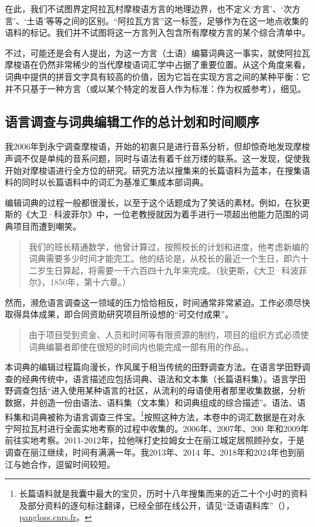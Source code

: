 在此，我们不试图界定阿拉瓦村摩梭语方言的地理边界，也不定义‘方言’、‘次方言’、‘土语’等等之间的区别。“阿拉瓦方言”这一标签，足够作为在这一地点收集的语料的标记。我们并不试图将这一方言列入包含所有摩梭方言的某个综合清单中。

不过，可能还是会有人提出，为这一方言（土语）编纂词典这一事实，就使阿拉瓦摩梭语在仍然非常稀少的当代摩梭语词汇学中占据了重要位置。从这个角度来看，词典中提供的拼音文字具有较高的价值，因为它旨在实现方言之间的某种平衡：它并不只基于一种方言（或以某个特定的发音人作为标准：作为权威参考），细见\textcite{dobbs_ortho_2018}。

\subsection{语言调查与词典编辑工作的总计划和时间顺序}

我2006年到永宁调查摩梭语，开始的初衷只是进行音系分析，但却惊奇地发现摩梭声调不仅是单纯的音系问题，同时与语法有着千丝万缕的联系。这一发现，促使我开始对摩梭语进行全方位的研究。研究方法以搜集来的长篇语料为蓝本，在搜集语料的同时以长篇语料中的词汇为基准汇集成本部词典。

编辑词典的过程一般都很漫长，以至于这个话题成为了笑话的素材。例如，在狄更斯的《大卫·科波菲尔》中，一位老教授就因为着手进行一项超出他能力范围的词典项目而遭到嘲笑。
\begin{quotation}
    我们的班长精通数学，他曾计算过，按照校长的计划和进度，他考虑新编的词典需要多少时间才能完工。他的结论是，从校长的最近一个生日，即六十二岁生日算起，将需要一千六百四十九年来完成。（狄更斯，《大卫·科波菲尔》，1850年，第十六章。）
\end{quotation}

然而，濒危语言调查这一领域的压力恰恰相反，时间通常非常紧迫。工作必须尽快取得具体成果，即合同资助研究项目所设想的“可交付成果”。
\begin{quotation}
    由于项目受到资金、人员和时间等有限资源的制约，项目的组织方式必须使词典编纂者即使在很短的时间内也能完成一部有用的作品。\parencite[“濒危语言社区的词典编纂”:][42]{mosel_dictionary_2004}。
\end{quotation}

本词典的编辑过程篇向漫长，作风属于相当传统的田野调查方法。在语言学田野调查的经典传统中，语言描述应包括词典、语法和文本集（长篇语料集）\parencite{michaud2012_yongning}。语言学田野调查包括“进入使用某种语言的社区，从流利的母语使用者那里收集数据，分析数据，并创造一份由语法、语料集（文本集）和词典组成的综合描述”\parencite[12]{dixon2007}。语法、语料集和词典被称为语言调查三件宝\parencite{sun2007}。\footnote{长篇语料就是我囊中最大的宝贝，历时十八年搜集而来的近二十个小时的资料及部分资料的逐句标注翻译，已经全部在线公开，请见“泛语语料库”（），\href{https://pangloss.cnrs.fr/}{pangloss.cnrs.fr}。}按照这种方法，本卷中的词汇数据是在对永宁阿拉瓦村进行全面实地考察的过程中收集的。2006年、2007年、200 年和2009年前往实地考察。2011-2012年，拉他咪打史拉姆女士在丽江城定居照顾孙女，于是调查在丽江继续，时间有满满一年。我2013年、2014 年、2018年和2024年也到丽江与她合作，逗留时间较短。

